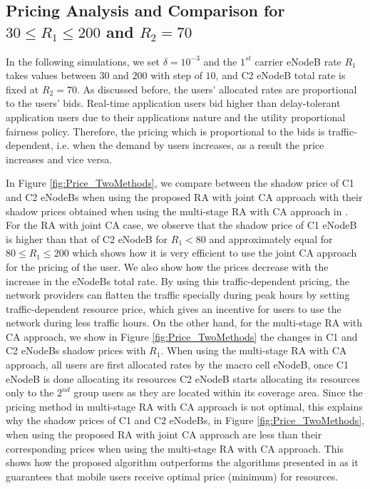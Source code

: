 \documentclass[journal]{IEEEtran} 		\usepackage{amsmath,amssymb}
\begin{document}
\subsection{Pricing Analysis and Comparison for $30\le R_1\le200$ and $R_2=70$}
In the following simulations, we set $\delta =10^{-3}$ and the $1^{st}$ carrier eNodeB rate $R_1$ takes values between $30$ and $200$ with step of $10$, and C2 eNodeB total rate is fixed at $R_2 = 70$. As discussed before, the users' allocated rates are proportional to the users' bids. Real-time application users bid higher than delay-tolerant application users due to their applications nature and the utility proportional fairness policy. Therefore, the pricing which is proportional to the bids is traffic-dependent, i.e. when the demand by users increases, as a result the price increases and vice versa.

In Figure \ref{fig:Price_TwoMethods}, we compare between the shadow price of C1 and C2 eNodeBs when using the proposed RA with joint CA approach with their shadow prices obtained when using the multi-stage RA with CA approach in \cite{Haya_Utility1,Haya_Utility3,Haya_Utility6}. For the RA with joint CA case, we observe that the shadow price of C1 eNodeB is higher than that of C2 eNodeB for $R_1 < 80$ and approximately equal for $80\leq R_1\leq200$ which shows how it is very efficient to use the joint CA approach for the pricing of the user. We also show how the prices decrease with the increase in the eNodeBs total rate. By using this traffic-dependent pricing, the network providers can flatten the traffic specially during peak hours by setting traffic-dependent resource price, which gives an incentive for users to use the network during less traffic hours. On the other hand, for the multi-stage RA with CA approach, we show in Figure \ref{fig:Price_TwoMethods} the changes in C1 and C2 eNodeBs shadow prices
with $R_1$. When using the multi-stage RA with CA approach, all users are first allocated rates by the macro cell eNodeB, once C1 eNodeB is done allocating its resources C2 eNodeB starts allocating its resources only to the $2^{nd}$ group users as they are located within its coverage area. Since the pricing method in multi-stage RA with CA approach is not optimal, this explains why the shadow prices of C1 and C2 eNodeBs, in Figure \ref{fig:Price_TwoMethods}, when using the proposed RA with joint CA approach are less than their corresponding prices when using the multi-stage RA with CA approach. This shows how the proposed algorithm outperforms the algorithms presented in \cite{Haya_Utility1,Haya_Utility3,Haya_Utility6} as it guarantees that mobile users receive optimal price (minimum) for resources.
\end{document}
